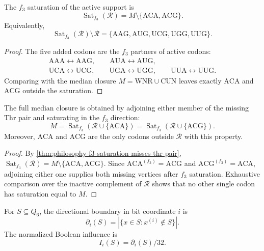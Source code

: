 \begin{theorem}
\label{thm:philosophy-f3-saturation-misses-thr-pair}
The $f_{3}$ saturation of the active support is
$$
  \operatorname{Sat}_{f_{3}}(\mathcal{R})
  =
  M\setminus\{\mathrm{ACA},\mathrm{ACG}\}.
$$
Equivalently,
$$
  \operatorname{Sat}_{f_{3}}(\mathcal{R})\setminus\mathcal{R}
  =
  \{\mathrm{AAG},\mathrm{AUG},\mathrm{UCG},\mathrm{UGG},\mathrm{UUG}\}.
$$
\end{theorem}
\begin{proof}
The five added codons are the $f_{3}$ partners of active codons:
$$
\begin{gathered}
  \mathrm{AAA}\leftrightarrow\mathrm{AAG},\qquad
  \mathrm{AUA}\leftrightarrow\mathrm{AUG},\\
  \mathrm{UCA}\leftrightarrow\mathrm{UCG},\qquad
  \mathrm{UGA}\leftrightarrow\mathrm{UGG},\qquad
  \mathrm{UUA}\leftrightarrow\mathrm{UUG}.
\end{gathered}
$$
Comparing with the median closure
$M=\mathrm{WNR}\cup\mathrm{CUN}$ leaves exactly
$\mathrm{ACA}$ and $\mathrm{ACG}$ outside the saturation.
\end{proof}

\begin{theorem}
\label{thm:philosophy-wobble-saturation-presentation}
The full median closure is obtained by adjoining either member of the
missing Thr pair and saturating in the $f_{3}$ direction:
$$
  M
  =
  \operatorname{Sat}_{f_{3}}(\mathcal{R}\cup\{\mathrm{ACA}\})
  =
  \operatorname{Sat}_{f_{3}}(\mathcal{R}\cup\{\mathrm{ACG}\}).
$$
Moreover, $\mathrm{ACA}$ and $\mathrm{ACG}$ are the only codons outside
$\mathcal{R}$ with this property.
\end{theorem}
\begin{proof}
By \autoref{thm:philosophy-f3-saturation-misses-thr-pair},
$\operatorname{Sat}_{f_{3}}(\mathcal{R})=M\setminus
\{\mathrm{ACA},\mathrm{ACG}\}$. Since
$\mathrm{ACA}^{(f_{3})}=\mathrm{ACG}$ and
$\mathrm{ACG}^{(f_{3})}=\mathrm{ACA}$, adjoining either one supplies
both missing vertices after $f_{3}$ saturation. Exhaustive comparison
over the inactive complement of $\mathcal{R}$ shows that no other
single codon has saturation equal to $M$.
\end{proof}

\begin{definition}
\label{def:philosophy-directional-boundary}
For $S\subseteq Q_{6}$, the directional boundary in bit coordinate $i$
is
$$
  \partial_{i}(S)
  =
  |\{x\in S:x^{(i)}\notin S\}|.
$$
The normalized Boolean influence is
$$
  I_{i}(S)=\partial_{i}(S)/32.
$$
\end{definition}

